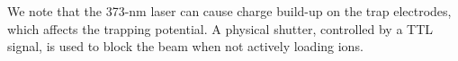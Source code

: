     We note that the 373-nm laser can cause charge build-up on the trap electrodes, which 
    affects the trapping potential. 
    A physical shutter, controlled by a TTL signal, is used to block
    the beam when not actively loading ions.


